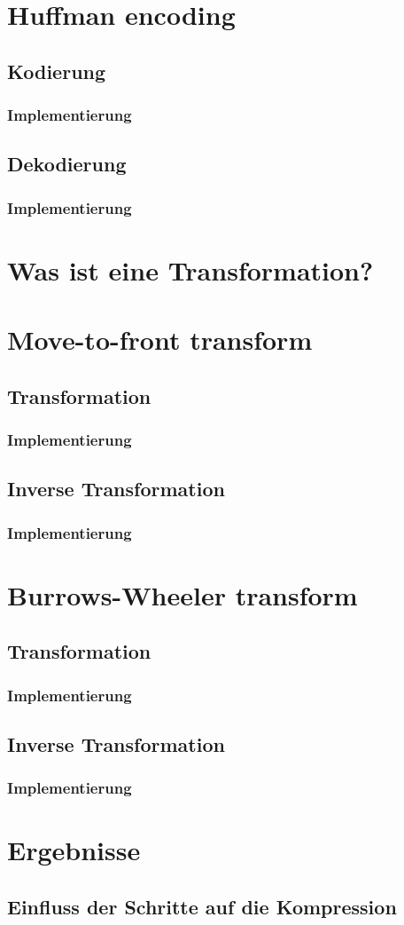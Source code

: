 \documentclass{article}
\begin{document}
\section{Huffman encoding}
\subsection{Kodierung}
\subsubsection{Implementierung}
\subsection{Dekodierung}
\subsubsection{Implementierung}
\newpage
\section{Was ist eine Transformation?}
\section{Move-to-front transform}
\subsection{Transformation}
\subsubsection{Implementierung}
\subsection{Inverse Transformation}
\subsubsection{Implementierung}
\newpage
\section{Burrows-Wheeler transform}
\subsection{Transformation}
\subsubsection{Implementierung}
\subsection{Inverse Transformation}
\subsubsection{Implementierung}
\newpage
\section{Ergebnisse}
\subsection{Einfluss der Schritte auf die Kompression}
\printbibliography[heading=bibintoc]
\end{document}
